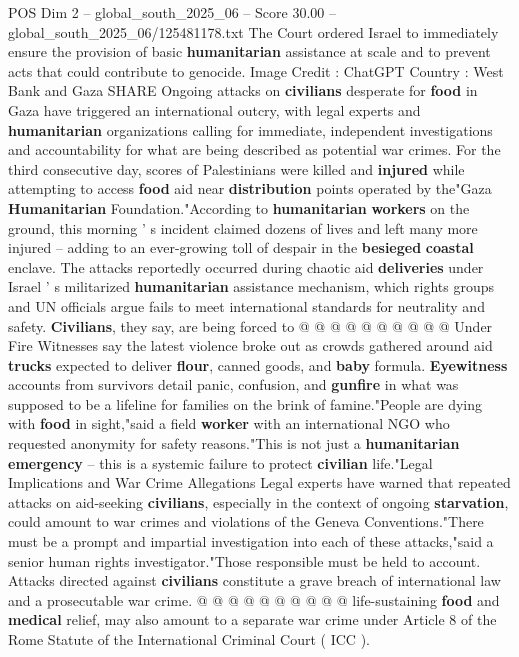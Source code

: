\begin{textsample}{POS Dim 2 – global\_south\_2025\_06 – Score 30.00 – global\_south\_2025\_06/125481178.txt}  \label{ex:f2_pos_085}
The Court ordered Israel to immediately ensure the provision of basic \textbf{humanitarian} assistance at scale and to prevent acts that could contribute to genocide.
Image Credit : ChatGPT Country : West Bank and Gaza SHARE Ongoing attacks on \textbf{civilians} desperate for \textbf{food} in Gaza have triggered an international outcry, with legal experts and \textbf{humanitarian} organizations calling for immediate, independent investigations and accountability for what are being described as potential war crimes.
For the third consecutive day, scores of Palestinians were killed and \textbf{injured} while attempting to access \textbf{food} aid near \textbf{distribution} points operated by the"Gaza \textbf{Humanitarian} Foundation."According to \textbf{humanitarian} \textbf{workers} on the ground, this morning ' s incident claimed dozens of lives and left many more injured -- adding to an ever-growing toll of despair in the \textbf{besieged} \textbf{coastal} enclave.
The attacks reportedly occurred during chaotic aid \textbf{deliveries} under Israel ' s militarized \textbf{humanitarian} assistance mechanism, which rights groups and UN officials argue fails to meet international standards for neutrality and safety. \textbf{Civilians}, they say, are being forced to @ @ @ @ @ @ @ @ @ @ Under Fire Witnesses say the latest violence broke out as crowds gathered around aid \textbf{trucks} expected to deliver \textbf{flour}, canned goods, and \textbf{baby} formula. \textbf{Eyewitness} accounts from survivors detail panic, confusion, and \textbf{gunfire} in what was supposed to be a lifeline for families on the brink of famine."People are dying with \textbf{food} in sight,"said a field \textbf{worker} with an international NGO who requested anonymity for safety reasons."This is not just a \textbf{humanitarian} \textbf{emergency} -- this is a systemic failure to protect \textbf{civilian} life."Legal Implications and War Crime Allegations Legal experts have warned that repeated attacks on aid-seeking \textbf{civilians}, especially in the context of ongoing \textbf{starvation}, could amount to war crimes and violations of the Geneva Conventions."There must be a prompt and impartial investigation into each of these attacks,"said a senior human rights investigator."Those responsible must be held to account.
Attacks directed against \textbf{civilians} constitute a grave breach of international law and a prosecutable war crime. @ @ @ @ @ @ @ @ @ @ life-sustaining \textbf{food} and \textbf{medical} relief, may also amount to a separate war crime under Article 8 of the Rome Statute of the International Criminal Court ( ICC ).

\end{textsample}

